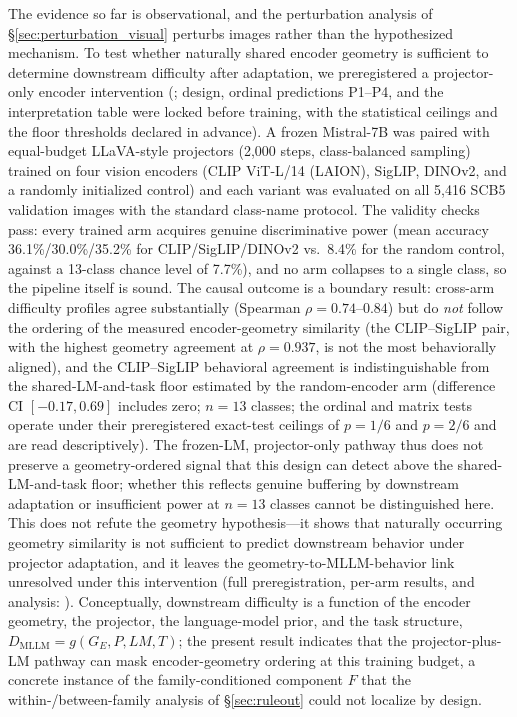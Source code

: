 \documentclass[a4paper,fleqn]{cas-sc}
\begin{document}
The evidence so far is observational, and the perturbation analysis of \S\ref{sec:perturbation_visual} perturbs images rather than the hypothesized mechanism. To test whether naturally shared encoder geometry is sufficient to determine downstream difficulty after adaptation, we preregistered a projector-only encoder intervention (; design, ordinal predictions P1--P4, and the interpretation table were locked before training, with the statistical ceilings and the floor thresholds declared in advance). A frozen Mistral-7B was paired with equal-budget LLaVA-style projectors (2{,}000 steps, class-balanced sampling) trained on four vision encoders (CLIP ViT-L/14 (LAION), SigLIP, DINOv2, and a randomly initialized control) and each variant was evaluated on all 5{,}416 SCB5 validation images with the standard class-name protocol. The validity checks pass: every trained arm acquires genuine discriminative power (mean accuracy 36.1\%/30.0\%/35.2\% for CLIP/SigLIP/DINOv2 vs.\ 8.4\% for the random control, against a 13-class chance level of 7.7\%), and no arm collapses to a single class, so the pipeline itself is sound. The causal outcome is a boundary result: cross-arm difficulty profiles agree substantially (Spearman $\rho=0.74$--$0.84$) but do \emph{not} follow the ordering of the measured encoder-geometry similarity (the CLIP--SigLIP pair, with the highest geometry agreement at $\rho=0.937$, is not the most behaviorally aligned), and the CLIP--SigLIP behavioral agreement is indistinguishable from the shared-LM-and-task floor estimated by the random-encoder arm (difference CI $[-0.17, 0.69]$ includes zero; $n=13$ classes; the ordinal and matrix tests operate under their preregistered exact-test ceilings of $p=1/6$ and $p=2/6$ and are read descriptively). The frozen-LM, projector-only pathway thus does not preserve a geometry-ordered signal that this design can detect above the shared-LM-and-task floor; whether this reflects genuine buffering by downstream adaptation or insufficient power at $n=13$ classes cannot be distinguished here. This does not refute the geometry hypothesis---it shows that naturally occurring geometry similarity is not sufficient to predict downstream behavior under projector adaptation, and it leaves the geometry-to-MLLM-behavior link unresolved under this intervention (full preregistration, per-arm results, and analysis: ). Conceptually, downstream difficulty is a function of the encoder geometry, the projector, the language-model prior, and the task structure, $D_{\mathrm{MLLM}} = g(G_E, P, LM, T)$; the present result indicates that the projector-plus-LM pathway can mask encoder-geometry ordering at this training budget, a concrete instance of the family-conditioned component $F$ that the within-/between-family analysis of \S\ref{sec:ruleout} could not localize by design.
\end{document}
